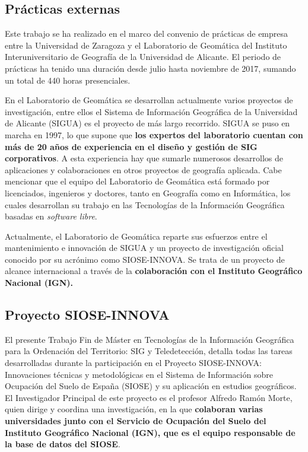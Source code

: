 
\begin{prologo}\label{chap:prol}

\subsection*{Prácticas externas}
Este trabajo se ha realizado en el marco del convenio de prácticas de empresa entre la Universidad de Zaragoza y el Laboratorio de Geomática del Instituto Interuniversitario de Geografía de la Universidad de Alicante. El periodo de prácticas ha tenido una duración desde julio hasta noviembre de 2017, sumando un total de 440 horas presenciales.

En el Laboratorio de Geomática se desarrollan actualmente varios proyectos de investigación, entre ellos el Sistema de Información Geográfica de la Universidad de Alicante (SIGUA) es el proyecto de más largo recorrido. SIGUA se puso en marcha en 1997, lo que supone que \textbf{los expertos del laboratorio cuentan con más de 20 años de experiencia en el diseño y gestión de SIG corporativos}. A esta experiencia hay que sumarle numerosos desarrollos de aplicaciones y colaboraciones en otros proyectos de geografía aplicada. Cabe mencionar que el equipo del Laboratorio de Geomática está formado por licenciados, ingenieros y doctores, tanto en Geografía como en Informática, los cuales desarrollan su trabajo en las Tecnologías de la Información Geográfica basadas en \textit{software libre}.

Actualmente, el Laboratorio de Geomática reparte sus esfuerzos entre el mantenimiento e innovación de SIGUA y un proyecto de investigación oficial conocido por su acrónimo como SIOSE-INNOVA. Se trata de un proyecto de alcance internacional a través de la \textbf{colaboración con el Instituto Geográfico Nacional (IGN).}

\subsection*{Proyecto SIOSE-INNOVA}
El presente Trabajo Fin de Máster en Tecnologías de la Información Geográfica para la Ordenación del Territorio: SIG y Teledetección, detalla todas las tareas desarrolladas durante la participación en el Proyecto SIOSE-INNOVA: Innovaciones técnicas y metodológicas en el Sistema de Información sobre Ocupación del Suelo de España (SIOSE) y su aplicación en estudios geográficos. El Investigador Principal de este proyecto es el profesor Alfredo Ramón Morte, quien dirige y coordina una investigación, en la que \textbf{colaboran varias universidades junto con el  Servicio de Ocupación del Suelo del Instituto Geográfico Nacional (IGN), que es el equipo responsable de la base de datos del SIOSE}.


\end{prologo}
